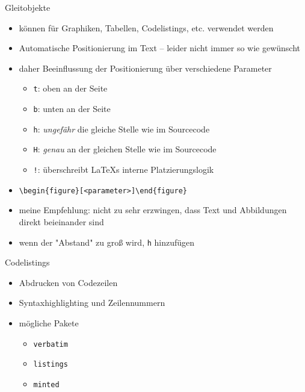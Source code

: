 \documentclass[presentation,aspectratio=169]{beamer}
\begin{document}
\begin{frame}[fragile]{Gleitobjekte}
  \begin{itemize}
    \item können für Graphiken, Tabellen, Codelistings, etc. verwendet werden
    \item Automatische Positionierung im Text -- leider nicht immer so wie gewünscht
    \item daher Beeinflussung der Positionierung über verschiedene Parameter
      \begin{itemize}
        \item \verb|t|: oben an der Seite
        \item \verb|b|: unten an der Seite
        \item \verb|h|: \emph{ungefähr} die gleiche Stelle wie im Sourcecode
        \item \verb|H|: \emph{genau} an der gleichen Stelle wie im Sourcecode
        \item \verb|!|: überschreibt \LaTeX{}s interne Platzierungslogik
      \end{itemize}
    \item \verb|\begin{figure}[<parameter>]\end{figure}|
    \item meine Empfehlung: nicht zu sehr erzwingen, dass Text und Abbildungen direkt beieinander sind
    \item wenn der "Abstand" zu groß wird, \verb|h| hinzufügen
  \end{itemize}
\end{frame}

\begin{frame}[fragile]{Codelistings}
  \begin{itemize}
    \item Abdrucken von Codezeilen
    \item Syntaxhighlighting und Zeilennummern
    \item mögliche Pakete
      \begin{itemize}
        \item \verb|verbatim|
        \item \verb|listings|
        \item \verb|minted|
      \end{itemize}
  \end{itemize}
\end{frame}
\end{document}
